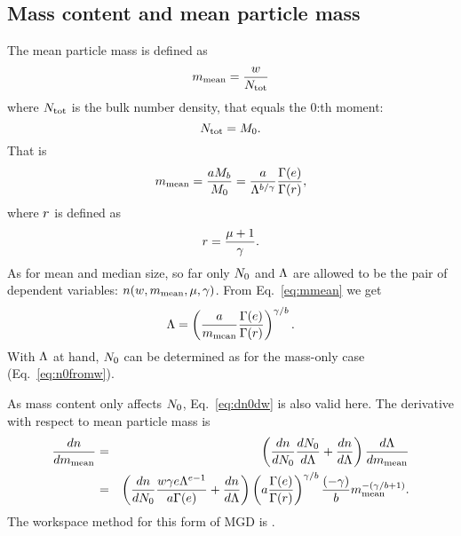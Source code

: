 \subsection{Mass content and mean particle mass}
%
The mean particle mass is defined as
\begin{equation}
  m_\mathrm{mean} = \frac{w}{N_{\mathrm{tot}}}
\end{equation}
where $N_{\mathrm{tot}}$ is the bulk number density, that equals the 0:th moment:
\begin{equation}
  N_{\mathrm{tot}} = M_0.
  \label{eq:ntot}
\end{equation}
That is
\begin{equation}
  m_\mathrm{mean} = \frac{aM_b}{M_0} = \frac{a}{\Lambda^{b/\gamma}}\frac{\Gamma(e)}{\Gamma(r)},
  \label{eq:mmean}
\end{equation}
where $r$ is defined as
\begin{equation}
  r = \frac{\mu+1}{\gamma}.
\end{equation}
As for mean and median size, so far only $N_0$ and $\Lambda$ are allowed to be the
pair of dependent variables: $n(w,m_\mathrm{mean},\mu,\gamma)$. From
Eq.~\ref{eq:mmean} we get
\begin{equation}
  \Lambda = \left( \frac{a}{m_\mathrm{mean}} \frac{\Gamma(e)}{\Gamma(r)}\right)^{\gamma/b}.
\end{equation}
With $\Lambda$ at hand, $N_0$ can be determined as for the mass-only case
(Eq.~\ref{eq:n0fromw}).

As mass content only affects $N_0$, Eq.~\ref{eq:dn0dw} is also valid here.
The derivative with respect to mean particle mass is 
\begin{eqnarray}
  \frac{dn}{dm_\mathrm{mean}} &=& \left( \frac{dn}{dN_0}\frac{dN_0}{d\Lambda} + 
                        \frac{dn}{d\Lambda} \right) \frac{d\Lambda}{dm_\mathrm{mean}} \nonumber\\
 &=& \left( \frac{dn}{dN_0} \frac{w\gamma e\Lambda^{e-1}}{a\Gamma(e)} + 
                        \frac{dn}{d\Lambda} \right) 
   \left(a\frac{\Gamma(e)}{\Gamma(r)}\right)^{\gamma/b} \frac{(-\gamma)}{b}m_\mathrm{mean}^{-(\gamma/b+1)}.
\end{eqnarray}
The workspace method for this form of MGD is .





